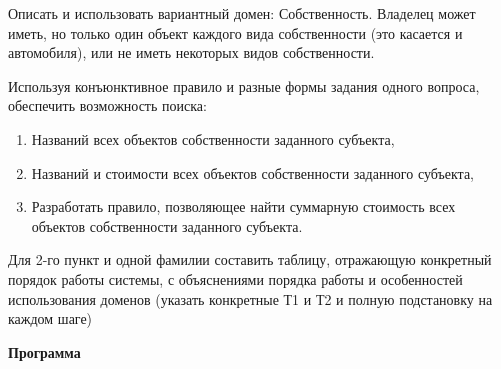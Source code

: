 \documentclass[a4paper,14pt]{extreport} %
\begin{document}
Описать  и использовать вариантный домен: Собственность. Владелец может иметь, но только один объект каждого вида собственности (это касается и автомобиля), или не иметь некоторых видов собственности. 

\hfill

Используя конъюнктивное правило и разные формы задания одного вопроса, обеспечить возможность поиска:
\begin{enumerate}
\item Названий всех объектов собственности заданного субъекта,
\item Названий и стоимости всех объектов собственности заданного субъекта,
\item Разработать правило, позволяющее найти суммарную стоимость всех объектов собственности заданного субъекта.
\end{enumerate}

\hfill

Для 2-го пункт и одной фамилии составить таблицу, отражающую конкретный порядок работы системы, с объяснениями порядка работы и особенностей использования доменов (указать конкретные Т1 и Т2 и полную подстановку на каждом шаге)


\hfill

\textbf{Программа}
\end{document}
